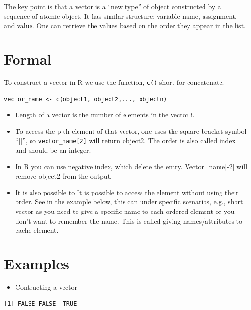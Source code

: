 \documentclass[
  letterpaper,
  DIV=11,
  numbers=noendperiod]{scrreprt}
\providecommand{\tightlist}{%
  \setlength{\itemsep}{0pt}\setlength{\parskip}{0pt}}
\begin{document}
The key point is that a vector is a ``new type'' of object constructed
by a sequence of atomic object. It has similar structure: variable name,
assignment, and value. One can retrieve the values based on the order
they appear in the list.

\section*{Formal}\label{formal-34}


To construct a vector in R we use the function, \texttt{c()} short for
concatenate.

\texttt{vector\_name\ \textless{}-\ c(object1,\ object2,...,\ objectn)}

\begin{itemize}
\item
  Length of a vector is the number of elements in the vector i.
\item
  To access the p-th element of that vector, one uses the square bracket
  symbol ``{[}{]}'', so \texttt{vector\_name{[}2{]}} will return
  object2. The order is also called index and should be an integer.
\item
  In R you can use negative index, which delete the entry.
  Vector\_name{[}-2{]} will remove object2 from the output.
\item
  It is also possible to It is possible to access the element without
  using their order. See in the example below, this can under specific
  scenarios, e.g., short vector as you need to give a specific name to
  each ordered element or you don't want to remember the name. This is
  called giving names/attributes to eache element.
\end{itemize}

\section*{Examples}\label{examples-33}


\begin{itemize}
\tightlist
\item
  Contructing a vector
\end{itemize}

\begin{verbatim}
[1] FALSE FALSE  TRUE
\end{verbatim}
\end{document}
